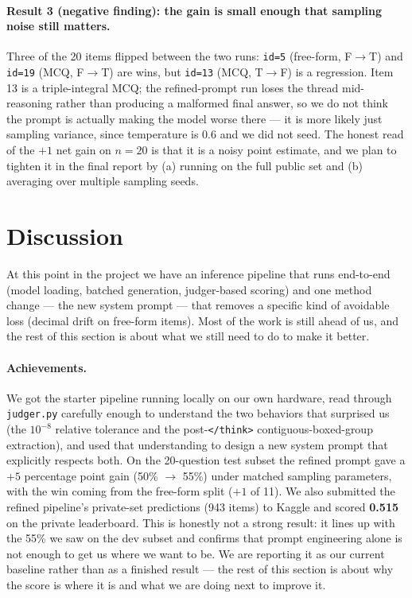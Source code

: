 \documentclass{article}
\begin{document}
\paragraph{Result 3 (negative finding): the gain is small enough that sampling noise still matters.}
Three of the 20 items flipped between the two runs: \texttt{id=5}
(free-form, F$\rightarrow$T) and \texttt{id=19} (MCQ,
F$\rightarrow$T) are wins, but \texttt{id=13} (MCQ, T$\rightarrow$F)
is a regression. Item 13 is a triple-integral MCQ; the refined-prompt
run loses the thread mid-reasoning rather than producing a malformed
final answer, so we do not think the prompt is actually making the
model worse there --- it is more likely just sampling variance, since
temperature is 0.6 and we did not seed. The honest read of the
$+1$ net gain on $n=20$ is that it is a noisy point estimate, and
we plan to tighten it in the final report by (a) running on the
full public set and (b) averaging over multiple sampling seeds.


\section{Discussion}
\label{sec:discussion}
At this point in the project we have an inference pipeline that runs
end-to-end (model loading, batched generation, judger-based scoring)
and one method change --- the new system prompt --- that removes a
specific kind of avoidable loss (decimal drift on free-form items).
Most of the work is still ahead of us, and the rest of this section
is about what we still need to do to make it better.

\paragraph{Achievements.}
We got the starter pipeline running locally on our own hardware, read
through \texttt{judger.py} carefully enough to understand the two
behaviors that surprised us (the $10^{-8}$ relative tolerance and
the post-\texttt{</think>} contiguous-boxed-group extraction), and
used that understanding to design a new system prompt that explicitly
respects both. On the 20-question test subset the refined prompt
gave a $+5$ percentage point gain (50\% $\to$ 55\%) under
matched sampling parameters, with the win coming from the free-form
split ($+1$ of 11). We also submitted the refined pipeline's
private-set predictions (943 items) to Kaggle and scored
\textbf{0.515} on the private leaderboard. This is honestly not a
strong result: it lines up with the 55\% we saw on the dev subset
and confirms that prompt engineering alone is not enough to get us
where we want to be. We are reporting it as our current baseline
rather than as a finished result --- the rest of this section is
about why the score is where it is and what we are doing next to
improve it.
\end{document}
